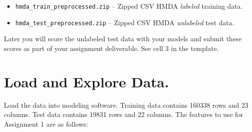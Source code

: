 \documentclass[fleqn]{article}
\begin{document}
\begin{itemize}
	\item \texttt{hmda\_train\_preprocessed.zip} -- Zipped CSV HMDA \textit{labeled} training data.
	\item \texttt{hmda\_test\_preprocessed.zip} -- Zipped CSV HMDA \textit{unlabeled} test data.
\end{itemize}

\noindent Later you will score the unlabeled test data with your models and submit these scores as part of your assignment deliverable. See cell 3 in the template.

\section{Load and Explore Data.}

Load the data into modeling software. Training data contains 160338 rows and 23 columns. Test data contains 19831 rows and 22 columns. The features to use for Assignment 1 are as follows:
\end{document}
